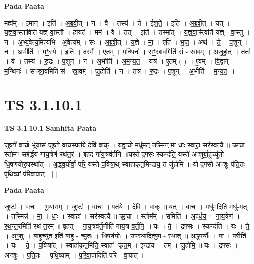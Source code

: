 \documentclass[17pt]{extarticle}
\begin{document}
\textbf{Pada Paata} \newline

मह्य᳚म् । इ॒मान् । इति॑ । अ॒ब्र॒वी॒त् । न । वै । तस्य॑ । ते । ई॒श॒ते॒ । इति॑ । अ॒ब्र॒वी॒त् । यत् । य॒ज्ञ्॒वा॒स्ताविति॑ यज्ञ्-वा॒स्तौ । हीय॑ते । मम॑ । वै । तत् । इति॑ । तस्मा᳚त् । य॒ज्ञ्॒वा॒स्त्विति॑ यज्ञ् - वा॒स्तु । न । अ॒भ्य॒वेत्य॒मित्य॑भि - अ॒वेत्य᳚म् । सः । अ॒ब्र॒वी॒त् । य॒ज्ञे । मा॒ । एति॑ । भ॒ज॒ । अथ॑ । ते॒ । प॒शून् । न । अ॒भीति॑ । मꣳ॒॒स्ये॒ । इति॑ । तस्मै᳚ । ए॒तम् । म॒न्थिनः॑ । सꣳ॒॒स्रा॒वमिति॑ सं - स्रा॒वम् । अ॒जु॒हो॒त् । ततः॑ । वै । तस्य॑ । रु॒द्रः । प॒शून् । न । अ॒भीति॑ । अ॒म॒न्य॒त॒ । यत्र॑ । ए॒तम् ( ) । ए॒वम् । वि॒द्वान् । म॒न्थिनः॑ । सꣳ॒॒स्रा॒वमिति॑ सं - स्रा॒वम् । जु॒होति॑ । न । तत्र॑ । रु॒द्रः । प॒शून् । अ॒भीति॑ । म॒न्य॒त॒ ॥  \newline





\section{ TS 3.1.10.1 }

\textbf{TS 3.1.10.1 } \newline
\textbf{Samhita Paata} \newline

जुष्टो॑ वा॒चो भू॑यासं॒ जुष्टो॑ वा॒चस्पत॑ये॒ देवि॑ वाक् । यद्वा॒चो मधु॑म॒त् तस्मि॑न् मा धाः॒ स्वाहा॒ सर॑स्वत्यै ॥ ऋ॒चा स्तोमꣳ॒॒ सम॑र्द्धय गाय॒त्रेण॑ रथंत॒रं । बृ॒हद्-गा॑य॒त्रव॑र्तनि ॥यस्ते᳚ द्र॒फ्सः स्कन्द॑ति॒ यस्ते॑ अꣳ॒॒शुर्बा॒हुच्यु॑तो धि॒षण॑योरु॒पस्था᳚त् । अ॒द्ध्व॒र्योर्वा॒ परि॒ यस्ते॑ प॒वित्रा॒थ् स्वाहा॑कृत॒मिन्द्रा॑य॒ तं जु॑होमि ॥ यो द्र॒फ्सो अꣳ॒॒शुः प॑ति॒तः पृ॑थि॒व्यां प॑रिवा॒पात् - [  ] \newline

\textbf{Pada Paata} \newline

जुष्टः॑ । वा॒चः । भू॒या॒स॒म् । जुष्टः॑ । वा॒चः । पत॑ये । देवि॑ । वा॒क् ॥ यत् । वा॒चः । मधु॑म॒दिति॒ मधु॑-म॒त् । तस्मिन्न्॑ । मा॒ । धाः॒ । स्वाहा᳚ । सर॑स्वत्यै ॥ ऋ॒चा । स्तोम᳚म् । समिति॑ । अ॒द्‌र्ध॒य॒ । गा॒य॒त्रेण॑ । र॒थ॒न्त॒रमिति॑ रथं-त॒रम् ॥ बृ॒हत् । गा॒य॒त्रव॑र्त॒नीति॑ गाय॒त्र-व॒र्त॒नि॒ ॥ यः । ते॒ । द्र॒फ्सः । स्कन्द॑ति । यः । ते॒ । अꣳ॒॒शुः । बा॒हुच्यु॑त॒ इति॑ बा॒हु - च्यु॒तः॒ । धि॒षण॑योः । उ॒पस्था॒दित्यु॒प - स्था॒त् ॥ अ॒द्ध्व॒र्योः । वा॒ । परीति॑ । यः । ते॒ । प॒वित्रा᳚त् । स्वाहा॑कृत॒मिति॒ स्वाहा᳚ -कृ॒त॒म् । इन्द्रा॑य । तम् । जु॒हो॒मि॒ ॥ यः । द्र॒फ्सः । अꣳ॒॒शुः । प॒ति॒तः । पृ॒थि॒व्याम् । प॒रि॒वा॒पादिति॑ परि - वा॒पात् ।  \newline
\end{document}
